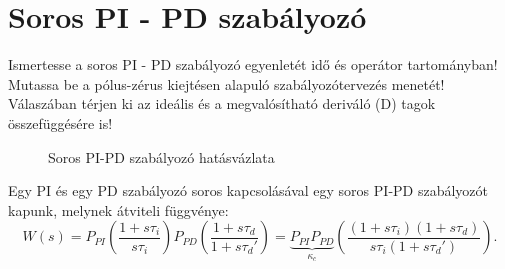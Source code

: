 \section{Soros PI - PD szabályozó}

\begin{about}
  Ismertesse a soros PI - PD szabályozó egyenletét idő és operátor tartományban!
  Mutassa be a pólus-zérus kiejtésen alapuló szabályozótervezés menetét!
  Válaszában térjen ki az ideális és a megvalósítható deriváló (D) tagok
  összefüggésére is!
\end{about}


\begin{figure}[htb]
  \centering
  
  \caption{Soros PI-PD szabályozó hatásvázlata}
  \label{fig:PIPD}
\end{figure}

Egy PI és egy PD szabályozó soros kapcsolásával egy soros PI-PD szabályozót
kapunk, melynek átviteli függvénye:
\begin{equation}
  W(s)
  =
  P_{PI} \left( \frac{1 + s\tau_i}{s\tau_i} \right)
  P_{PD} \left( \frac{1 + s\tau_d}{1 + s\tau_d'} \right)
  =
  \underbrace{P_{PI}P_{PD}}_{\kappa_c} \left(
  \frac{(1 + s\tau_i)(1 + s\tau_d)}{s\tau_i(1 + s\tau_d')}
  \right)
  .
  \label{eq:PIPD-1}
\end{equation}


